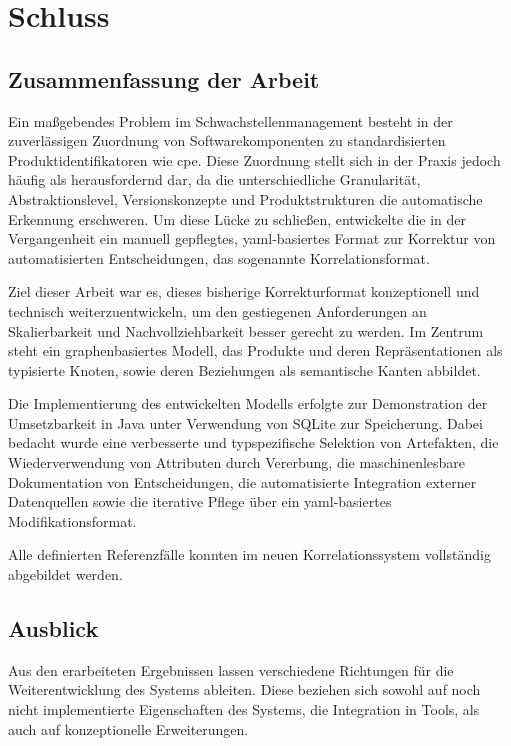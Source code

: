 \chapter{Schluss}\label{ch:abschluss}

\section{Zusammenfassung der Arbeit}\label{sec:schluss-zusammenfassung}

Ein maßgebendes Problem im Schwachstellenmanagement besteht in der zuverlässigen Zuordnung von Softwarekomponenten zu standardisierten Produktidentifikatoren wie \acrshort{cpe}.
Diese Zuordnung stellt sich in der Praxis jedoch häufig als herausfordernd dar, da die unterschiedliche Granularität, Abstraktionslevel, Versionskonzepte und Produktstrukturen die automatische Erkennung erschweren.
Um diese Lücke zu schließen, entwickelte die \metaeffektsp in der Vergangenheit ein manuell gepflegtes, \acrshort{yaml}-basiertes Format zur Korrektur von automatisierten Entscheidungen, das sogenannte Korrelationsformat.

Ziel dieser Arbeit war es, dieses bisherige Korrekturformat konzeptionell und technisch weiterzuentwickeln, um den gestiegenen Anforderungen an Skalierbarkeit und Nachvollziehbarkeit besser gerecht zu werden.
Im Zentrum steht ein graphenbasiertes Modell, das Produkte und deren Repräsentationen als typisierte Knoten, sowie deren Beziehungen als semantische Kanten abbildet.

Die Implementierung des entwickelten Modells erfolgte zur Demonstration der Umsetzbarkeit in Java unter Verwendung von SQLite zur Speicherung.
Dabei bedacht wurde eine verbesserte und typspezifische Selektion von Artefakten, die Wiederverwendung von Attributen durch Vererbung, die maschinenlesbare Dokumentation von Entscheidungen, die automatisierte Integration externer Datenquellen sowie die iterative Pflege über ein \acrshort{yaml}-basiertes Modifikationsformat.

Alle definierten Referenzfälle konnten im neuen Korrelationssystem vollständig abgebildet werden.

\section{Ausblick}\label{sec:schluss-ausblick}

Aus den erarbeiteten Ergebnissen lassen verschiedene Richtungen für die Weiterentwicklung des Systems ableiten.
Diese beziehen sich sowohl auf noch nicht implementierte Eigenschaften des Systems, die Integration in Tools, als auch auf konzeptionelle Erweiterungen.

